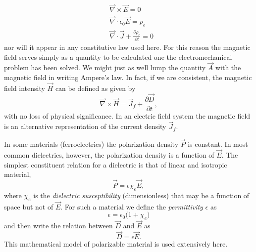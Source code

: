 \documentclass[11pt,a4paper,oneside]{book}
\numberwithin{equation}{section}
\theoremstyle{it}
\theoremstyle{definition}
\begin{document}
\begin{equation*}\label{}
	\begin{aligned}
		&\vec{\nabla}\times\vec{E}=0 \\[6pt]
		&\vec{\nabla}\cdot\epsilon_0\vec{E} = \rho_{e}\\[6pt]
		&\vec{\nabla}\cdot\vec{J}+\frac{\partial \rho_{e}}{\partial t}=0
	\end{aligned}
\end{equation*}
nor will it appear in any constitutive law used here. For this reason the magnetic field serves simply as a quantity to be calculated one the electromechanical problem has been solved. We might just as well lump the quantity $\vec{A}$ with the magnetic field in writing Ampere's law. In fact, if we are consistent, the magnetic field intensity $\vec{H}$ can be defined as given by
 \begin{equation}\label{constitutive_eq_20}
\vec{\nabla}\times\vec{H}=\vec{J}_f+\frac{\partial \vec{D}}{\partial t},
 \end{equation}
with no loss of physical significance. In an electric field system the magnetic field is an alternative representation of the current density $\vec{J}_f$. 

In some materials (ferroelectrics) the polarization density $\vec{P}$ is constant. In most common dielectrics, however, the polarization density is a function of $\vec{E}$. The simplest constituent relation for a dielectric is that of linear and isotropic material,
\begin{equation}\label{constitutive_eq_21}
	\vec{P}=\epsilon\chi_e\vec{E},
\end{equation}
where $\chi_e$ is the \textit{dielectric susceptibility} (dimensionless) that may be a function of space but not of $\vec{E}$. For such a material we define the \textit{permittivity} $\epsilon$ as
\begin{equation}\label{constitutive_eq_22}
	\epsilon=\epsilon_0\big(1+\chi_e\big)
\end{equation}
and then write the relation between $\vec{D}$ and $\vec{E}$ as
\begin{equation}\label{constitutive_eq_23}
	\vec{D}=\epsilon\vec{E}.
\end{equation}
This mathematical model of polarizable material is used extensively here. 
\end{document}
